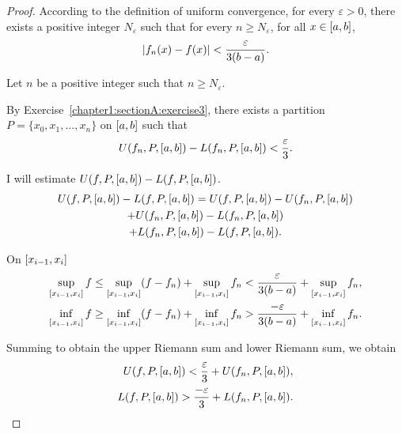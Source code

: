 \begin{proof}
    According to the definition of uniform convergence, for every $\varepsilon > 0$, there exists a positive integer $N_{\varepsilon}$ such that for every $n\geq N_{\varepsilon}$, for all $x\in \left[{a, b}\right]$,
    \[
        \left\vert{f_{n}(x) - f(x)}\right\vert < \frac{\varepsilon}{3(b - a)}.
    \]

    Let $n$ be a positive integer such that $n\geq N_{\varepsilon}$.

    By Exercise~\ref{chapter1:sectionA:exercise3}, there exists a partition $P = \{ x_{0}, x_{1}, \ldots, x_{n} \}$ on $\left[{a, b}\right]$ such that
    \[
        U(f_{n}, P, \left[{a, b}\right]) - L(f_{n}, P, \left[{a, b}\right]) < \frac{\varepsilon}{3}.
    \]

    I will estimate $U(f, P, \left[{a, b}\right]) - L(f, P, \left[{a, b}\right])$.
    \begin{multline*}
        U(f, P, \left[{a, b}\right]) - L(f, P, \left[{a, b}\right]) = U(f, P, \left[{a, b}\right]) - U(f_{n}, P, \left[{a, b}\right]) \\
        + U(f_{n}, P, \left[{a, b}\right]) - L(f_{n}, P, \left[{a, b}\right]) \\
        + L(f_{n}, P, \left[{a, b}\right]) - L(f, P, \left[{a, b}\right]).
    \end{multline*}

    On $\left[{x_{i-1}, x_{i}}\right]$
    \begin{align*}
        \sup\limits_{\left[{x_{i-1}, x_{i}}\right]}f \leq \sup\limits_{\left[{x_{i-1}, x_{i}}\right]}(f - f_{n}) + \sup\limits_{\left[{x_{i-1}, x_{i}}\right]}f_{n} < \frac{\varepsilon}{3(b - a)} + \sup\limits_{\left[{x_{i-1}, x_{i}}\right]}f_{n}, \\
        \inf\limits_{\left[{x_{i-1}, x_{i}}\right]}f \geq \inf\limits_{\left[{x_{i-1}, x_{i}}\right]}(f - f_{n}) + \inf\limits_{\left[{x_{i-1}, x_{i}}\right]}f_{n} > \frac{-\varepsilon}{3(b - a)} + \inf\limits_{\left[{x_{i-1}, x_{i}}\right]}f_{n}.
    \end{align*}

    Summing to obtain the upper Riemann sum and lower Riemann sum, we obtain
    \begin{align*}
        U(f, P, \left[{a, b}\right]) < \frac{\varepsilon}{3} + U(f_{n}, P, \left[{a, b}\right]), \\
        L(f, P, \left[{a, b}\right]) > \frac{-\varepsilon}{3} + L(f_{n}, P, \left[{a, b}\right]).
    \end{align*}


\end{proof}
